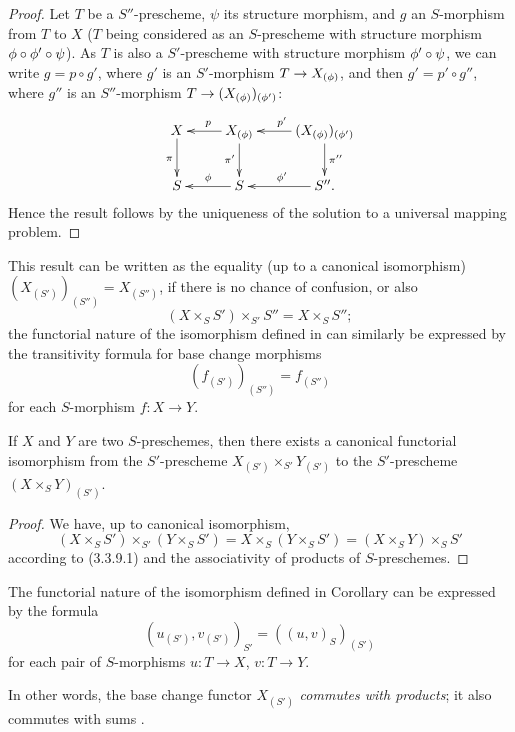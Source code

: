 \begin{proof}
\label{proof-1.3.3.9}
Let $T$ be a $S''$-prescheme, $\psi$ its structure morphism, and $g$ an
$S$-morphism from $T$ to $X$ ($T$ being considered as an $S$-prescheme with
structure morphism $\phi\circ\phi'\circ\psi$). As $T$ is also a $S'$-prescheme
with structure morphism $\phi'\circ\psi$, we can write $g=p\circ g'$, where
$g'$ is an $S'$-morphism $T\to X_{(\vphi)}$, and then $g'=p'\circ g''$, where
$g''$ is an $S''$-morphism $T\to(X_{(\vphi)})_{(\vphi')}$:
\[
  \xymatrix{
    X\ar[d]_\pi &
    X_{(\vphi)}\ar[l]_p\ar[d]_{\pi'} &
    (X_{(\vphi)})_{(\vphi')}\ar[l]_{p'}\ar[d]^{\pi''}\\
    S &
    S\ar[l]_\vphi &
    S''\ar[l]_{\vphi'}.
  }
\]
Hence the result follows by the uniqueness of the solution to a universal
mapping problem.
\end{proof}

This result can be written as the equality (up to a canonical isomorphism)
$(X_{(S')})_{(S'')}=X_{(S'')}$, if there is no chance of confusion, or also
\[
  (X\times_S S')\times_{S'}S''=X\times_S S'';
  \tag{3.3.9.1}
\]
the functorial nature of the isomorphism defined in  can
similarly be expressed by the transitivity formula for base change morphisms
\[
  (f_{(S')})_{(S'')}=f_{(S'')}
  \tag{3.3.9.2}
\]
for each $S$-morphism $f:X\to Y$.

\begin{cor}[3.3.10]
\label{1.3.3.10}
If $X$ and $Y$ are two $S$-preschemes, then there exists a canonical functorial
isomorphism from the $S'$-prescheme $X_{(S')}\times_{S'}Y_{(S')}$ to the
$S'$-prescheme $(X\times_S Y)_{(S')}$.
\end{cor}

\begin{proof}
\label{proof-1.3.3.10}
We have, up to canonical isomorphism,
\[
  (X\times_S S')\times_{S'}(Y\times_S S')
  =X\times_S(Y\times_S S')=(X\times_S Y)\times_S S'
\]
according to (3.3.9.1) and the associativity of products of $S$-preschemes.
\end{proof}

The functorial nature of the isomorphism defined in
Corollary  can be expressed by the formula
\[
  (u_{(S')},v_{(S')})_{S'}=((u,v)_S)_{(S')}
  \tag{3.3.10.1}
\]
for each pair of $S$-morphisms $u:T\to X$, $v:T\to Y$.

In other words, the base change functor $X_{(S')}$ \emph{commutes with
products}; it also commutes with sums .

